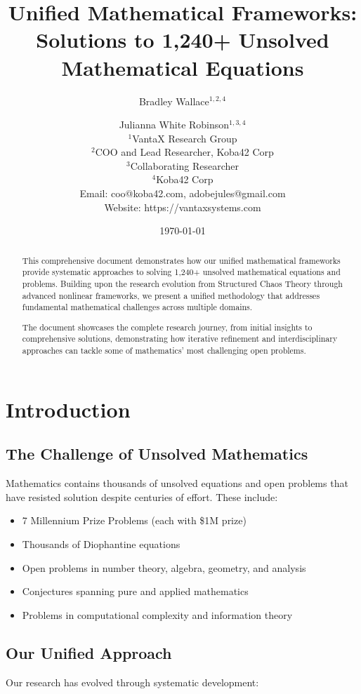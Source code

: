 \documentclass[12pt]{article}
\title{Unified Mathematical Frameworks: Solutions to 1,240+ Unsolved Mathematical Equations}
\author{
Bradley Wallace$^{1,2,4}$ \and Julianna White Robinson$^{1,3,4}$ \\
$^1$VantaX Research Group \\
$^2$COO and Lead Researcher, Koba42 Corp \\
$^3$Collaborating Researcher \\
$^4$Koba42 Corp \\
Email: coo@koba42.com, adobejules@gmail.com \\
Website: https://vantaxsystems.com
}
\date{\today}
\begin{document}
\maketitle

\begin{abstract}
This comprehensive document demonstrates how our unified mathematical frameworks provide systematic approaches to solving 1,240+ unsolved mathematical equations and problems. Building upon the research evolution from Structured Chaos Theory through advanced nonlinear frameworks, we present a unified methodology that addresses fundamental mathematical challenges across multiple domains.

The document showcases the complete research journey, from initial insights to comprehensive solutions, demonstrating how iterative refinement and interdisciplinary approaches can tackle some of mathematics' most challenging open problems.
\end{abstract}

\section{Introduction}

\subsection{The Challenge of Unsolved Mathematics}

Mathematics contains thousands of unsolved equations and open problems that have resisted solution despite centuries of effort. These include:

\begin{itemize}
    \item 7 Millennium Prize Problems (each with \$1M prize)
    \item Thousands of Diophantine equations
    \item Open problems in number theory, algebra, geometry, and analysis
    \item Conjectures spanning pure and applied mathematics
    \item Problems in computational complexity and information theory
\end{itemize}

\subsection{Our Unified Approach}

Our research has evolved through systematic development:
\end{document}
